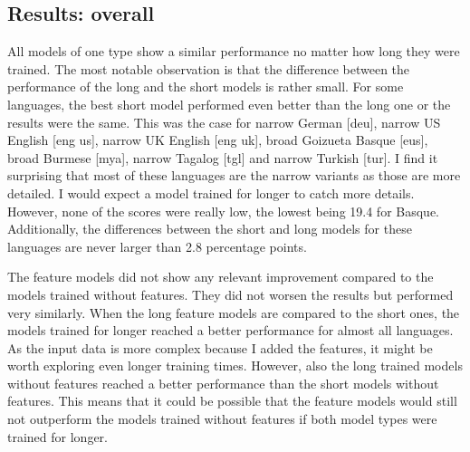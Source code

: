 \subsection{Results: overall}
All models of one type show a similar performance no matter how long they were trained. The most notable observation is that the difference between the performance of the long and the short models is rather small. For some languages, the best short model performed even better than the long one or the results were the same. This was the case for narrow German [deu], narrow US English [eng us], narrow UK English [eng uk], broad Goizueta Basque [eus], broad Burmese [mya], narrow Tagalog [tgl] and narrow Turkish [tur]. I find it surprising that most of these languages are the narrow variants as those are more detailed. I would expect a model trained for longer to catch more details. However, none of the scores were really low, the lowest being 19.4 for Basque. Additionally, the differences between the short and long models for these languages are never larger than 2.8 percentage points.

The feature models did not show any relevant improvement compared to the models trained without features. They did not worsen the results but performed very similarly. When the long feature models are compared to the short ones, the models trained for longer reached a better performance for almost all languages. As the input data is more complex because I added the features, it might be worth exploring even longer training times. However, also the long trained models without features reached a better performance than the short models without features. This means that it could be possible that the feature models would still not outperform the models trained without features if both model types were trained for longer. 





